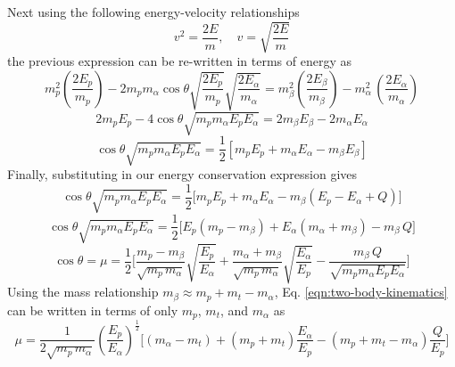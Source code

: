 \documentclass[../main.tex]{subfiles}
\begin{document}
Next using the following energy-velocity relationships
\begin{equation}
  v^2 = \dfrac{2E}{m}, \quad v = \sqrt{\dfrac{2 E}{m}}
\end{equation} 
the previous expression can be re-written in terms of energy as 
\begin{equation}
  m_p^2 \left(\dfrac{2E_p}{m_p}\right) - 2 m_p m_{\alpha} \cos \theta \sqrt{\dfrac{2E_p}{m_p}} \sqrt{\dfrac{2E_{\alpha}}{m_{\alpha}}} =  m_{\beta}^2 \left(\dfrac{2E_{\beta}}{m_{\beta}}\right) - m_{\alpha}^2 \, \left(\dfrac{2E_{\alpha}}{m_{\alpha}}\right)
\end{equation}
\begin{equation}
  2 m_p E_p - 4 \cos \theta \sqrt{m_p m_{\alpha} E_p E_{\alpha}} =  2 m_{\beta} E_{\beta} - 2 m_{\alpha} E_{\alpha}
\end{equation}
\begin{equation}
  \cos \theta \sqrt{m_p m_{\alpha} E_p E_{\alpha}} =  \dfrac{1}{2} \left[m_p E_p + m_{\alpha} E_{\alpha} - m_{\beta} E_{\beta}\right]
\end{equation}
Finally, substituting in our energy conservation expression gives
\begin{equation}
  \cos \theta \sqrt{m_p m_{\alpha} E_p E_{\alpha}} =  \dfrac{1}{2} \Big[m_p E_p + m_{\alpha} E_{\alpha} - m_{\beta} \left(E_p - E_{\alpha} + Q\right)\Big]
\end{equation}
\begin{equation}
  \cos \theta \sqrt{m_p m_{\alpha} E_p E_{\alpha}} =  \dfrac{1}{2} \Big[E_p\left(m_p - m_{\beta}\right) + E_{\alpha}\left(m_{\alpha} + m_{\beta}\right) - m_{\beta}\,Q\Big]
\end{equation}
\begin{equation} \label{eqn:two-body-kinematics}
  \boxed{\cos \theta = \mu = \dfrac{1}{2} \Bigg[\frac{m_p - m_{\beta}}{\sqrt{m_p \, m_{\alpha}}}\sqrt{\dfrac{E_p}{E_{\alpha}}} + \frac{m_{\alpha} + m_{\beta}}{\sqrt{m_p \, m_{\alpha}}}\sqrt{\dfrac{E_{\alpha}}{E_p}} - \dfrac{m_{\beta} \, Q}{\sqrt{m_p m_{\alpha} E_p E_{\alpha}}}\Bigg]}
\end{equation}
Using the mass relationship $m_{\beta} \approx m_p + m_t - m_{\alpha}$, Eq. \eqref{eqn:two-body-kinematics} can be written in terms of only $m_p$, $m_t$, and $m_{\alpha}$ as
\begin{equation}
  \mu = \dfrac{1}{2\sqrt{m_p \, m_{\alpha}}} \left(\dfrac{E_p}{E_{\alpha}}\right)^{\frac{1}{2}} \Bigg[\left(m_{\alpha} - m_{t}\right) + \left(m_{p} + m_{t}\right) \dfrac{E_{\alpha}}{E_p} - \left(m_p + m_t - m_{\alpha}\right)\dfrac{Q}{E_p}\Bigg]
\end{equation}
\end{document}
